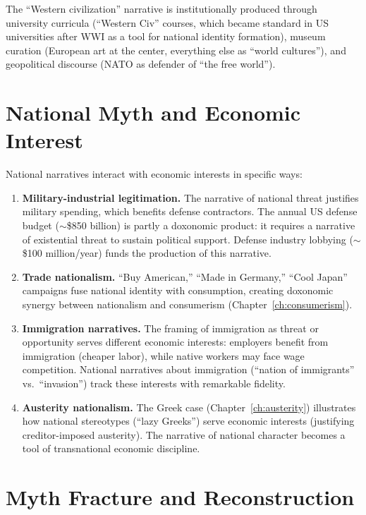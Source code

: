 The ``Western civilization'' narrative is institutionally produced through university curricula (``Western Civ'' courses, which became standard in US universities after WWI as a tool for national identity formation), museum curation (European art at the center, everything else as ``world cultures''), and geopolitical discourse (NATO as defender of ``the free world'').

\section{National Myth and Economic Interest}
\label{sec:ch27-economic}

National narratives interact with economic interests in specific ways:

\begin{enumerate}
  \item \textbf{Military-industrial legitimation.}
  The narrative of national threat justifies military spending, which benefits defense contractors.
  The annual US defense budget ($\sim$\$850 billion) is partly a doxonomic product: it requires a narrative of existential threat to sustain political support.
  Defense industry lobbying ($\sim$\$100 million/year) funds the production of this narrative.

  \item \textbf{Trade nationalism.}
  ``Buy American,'' ``Made in Germany,'' ``Cool Japan'' campaigns fuse national identity with consumption, creating doxonomic synergy between nationalism and consumerism (Chapter~\ref{ch:consumerism}).

  \item \textbf{Immigration narratives.}
  The framing of immigration as threat or opportunity serves different economic interests: employers benefit from immigration (cheaper labor), while native workers may face wage competition.
  National narratives about immigration (``nation of immigrants'' vs.\ ``invasion'') track these interests with remarkable fidelity.

  \item \textbf{Austerity nationalism.}
  The Greek case (Chapter~\ref{ch:austerity}) illustrates how national stereotypes (``lazy Greeks'') serve economic interests (justifying creditor-imposed austerity).
  The narrative of national character becomes a tool of transnational economic discipline.
\end{enumerate}

\section{Myth Fracture and Reconstruction}
\label{sec:ch27-fracture}

